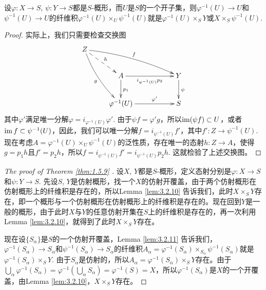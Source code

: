 \begin{lem}\label{lem:3.2.11}
设$\varphi:X\to S$, $\psi:Y\to S$都是$S$-概形，而$U$是$S$的一个开子集，则$\varphi^{-1}(U)\to U$和$\psi^{-1}(U)\to U$的纤维积$\varphi^{-1}(U)\times_U \psi^{-1}(U)$就是$\varphi^{-1}(U)\times_S Y$或$X\times_S \psi^{-1}(U)$.
\end{lem}

\begin{proof}
实际上，我们只需要检查交换图
\[
\begin{xy}
	\xymatrix{
		Z\ar@/_/[rdd]_{g}\ar@/^/[drrr]^{f}\ar@{-->}[dr]^h&&&\\
		&A\ar[rr]_-{i_{\psi^{-1}(U)}p_2}\ar[d]^{p_1}&&Y\ar[d]^\psi\\
		&\varphi^{-1}(U)\ar[rr]^-{\varphi'}&&S
	}
\end{xy}
\]
其中$\varphi'$满足唯一分解$\varphi=i_{\varphi^{-1}(U)}\varphi'$. 由于$\psi f=\varphi' g$，所以$\operatorname{im}(\psi f)\subset U$，或者$\operatorname{im} f\subset \psi^{-1}(U)$，因此，我们可以唯一分解$f=i_{\psi^{-1}(U)}f'$，其中$f':Z\to \psi^{-1}(U)$. 现在考虑$A=\varphi^{-1}(U)\times_{U}\psi^{-1}(U)$的泛性质，存在唯一的态射$h:Z\to A$，使得$g=p_1h$且$f'=p_2h$，所以$f=i_{\psi^{-1}(U)}f'=i_{\psi^{-1}(U)}p_2h$. 这就检验了上述交换图。
\end{proof}

\begin{proof}[The proof of Theorem \ref{thm:1.5.9} ]
设$X$, $Y$都是$S$-概形，定义态射分别是$\varphi:X\to S$和$\psi:Y\to S$. 先设$S$, $Y$是仿射概形，找一个$X$的仿射开覆盖，由于两个仿射概形在仿射概形上的纤维积是存在的，所以Lemma \ref{lem:3.2.10} 告诉我们，此时$X\times_S Y$存在，即一个概形与一个仿射概形在仿射概形上的纤维积是存在的。现在回到$Y$是一般的概形，由于此时$X$与$Y$的任意仿射开集在$S$上的纤维积是存在的，再一次利用Lemma \ref{lem:3.2.10}，就得到了此时$X\times_S Y$存在。

现在设$\{S_\alpha\}$是$S$的一个仿射开覆盖，Lemma \ref{lem:3.2.11} 告诉我们，$\varphi^{-1}(S_\alpha)\to S_\alpha$和$\psi^{-1}(S_\alpha)\to S_\alpha$的纤维积$A_\alpha=\varphi^{-1}(S_\alpha)\times_{S_\alpha}\psi^{-1}(S_\alpha)$就是$\varphi^{-1}(S_\alpha)\times_S Y$. 由于$S_\alpha$是仿射的，所以$A_\alpha=\varphi^{-1}(S_\alpha)\times_S Y$存在。由于$\bigcup_\alpha\varphi^{-1}(S_\alpha)=\varphi^{-1}\left(\bigcup_\alpha S_\alpha\right)=\varphi^{-1}(S)=X$，所以$\varphi^{-1}(S_\alpha)$是$X$的一个开覆盖，由Lemma \ref{lem:3.2.10}，$X\times_S Y$存在。
\end{proof}

